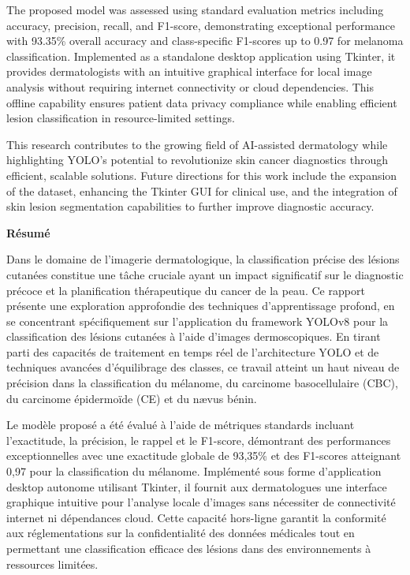 \documentclass[a4paper,12pt]{report}
\begin{document}
\begin{spacing}{1.5}
    The proposed model was assessed using standard evaluation metrics including accuracy, precision, recall, and F1-score, demonstrating exceptional performance with 93.35\% overall accuracy and class-specific F1-scores up to 0.97 for melanoma classification. Implemented as a standalone desktop application using Tkinter, it provides dermatologists with an intuitive graphical interface for local image analysis without requiring internet connectivity or cloud dependencies. This offline capability ensures patient data privacy compliance while enabling efficient lesion classification in resource-limited settings.

    This research contributes to the growing field of AI-assisted dermatology while highlighting YOLO's potential to revolutionize skin cancer diagnostics through efficient, scalable solutions. Future directions for this work include the expansion of the dataset, enhancing the Tkinter GUI for clinical use, and the integration of skin lesion segmentation capabilities to further improve diagnostic accuracy.

    \newpage
\begin{center}
    \textbf{\huge Résumé}
\end{center}

    Dans le domaine de l'imagerie dermatologique, la classification précise des lésions cutanées constitue une tâche cruciale ayant un impact significatif sur le diagnostic précoce et la planification thérapeutique du cancer de la peau. Ce rapport présente une exploration approfondie des techniques d'apprentissage profond, en se concentrant spécifiquement sur l'application du framework YOLOv8 pour la classification des lésions cutanées à l'aide d'images dermoscopiques. En tirant parti des capacités de traitement en temps réel de l'architecture YOLO et de techniques avancées d'équilibrage des classes, ce travail atteint un haut niveau de précision dans la classification du mélanome, du carcinome basocellulaire (CBC), du carcinome épidermoïde (CE) et du nævus bénin.

    Le modèle proposé a été évalué à l'aide de métriques standards incluant l'exactitude, la précision, le rappel et le F1-score, démontrant des performances exceptionnelles avec une exactitude globale de 93,35\% et des F1-scores atteignant 0,97 pour la classification du mélanome. Implémenté sous forme d'application desktop autonome utilisant Tkinter, il fournit aux dermatologues une interface graphique intuitive pour l'analyse locale d'images sans nécessiter de connectivité internet ni dépendances cloud. Cette capacité hors-ligne garantit la conformité aux réglementations sur la confidentialité des données médicales tout en permettant une classification efficace des lésions dans des environnements à ressources limitées.


\end{spacing}
\end{document}
